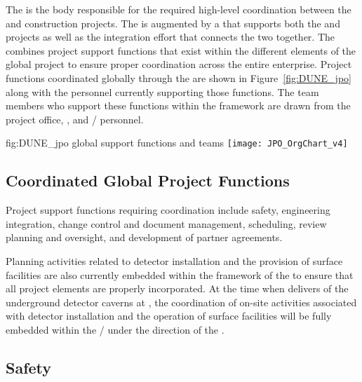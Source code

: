 The  is the body responsible for the required high-level
coordination between the  and  construction 
projects. 
The  is augmented by a  that supports both 
the  and  projects as well as the integration
effort that connects the two together. The  combines
project support functions that exist within the different elements 
of the global project to ensure proper coordination across the entire 
 enterprise.  Project functions coordinated globally 
through the  are shown in Figure~\ref{fig:DUNE_jpo} along 
with the personnel currently supporting those functions.  The team 
members who support these functions within the  framework
are drawn from the  project office,  , 
and /  personnel.  
\begin{dunefigure}{fig:DUNE_jpo}
  { global support functions and teams}
  \texttt{[image: JPO\_OrgChart\_v4]}
\end{dunefigure}


\subsection{Coordinated Global Project Functions}

Project support functions requiring  coordination include
safety, engineering integration, change control and document 
management, scheduling, review planning and oversight, and development 
of partner agreements.  

Planning activities related to detector installation and the provision 
of surface facilities are also currently embedded within the framework 
of the  to ensure that all project elements are properly 
incorporated.  At the time when   delivers 
 of the underground detector caverns at , the 
coordination of on-site activities associated with detector installation 
and the operation of surface facilities will be fully embedded within 
the /  under the direction of the .  


\subsection{Safety}    %
\label{sec:dune_safety}

